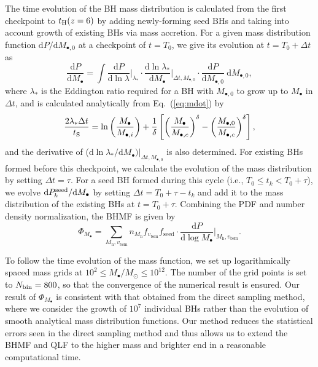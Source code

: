 \documentclass[twocolumn, twocolappendix]{aastex63}
\newcommand{\Msun}{M_\odot}
\newcommand{\Mh}{M_\mathrm{h}}
\newcommand{\Mbh}{M_\bullet}
\newcommand{\vbsm}{v_\mathrm{bsm}}
\newcommand{\tlife}{\tau}
\newcommand{\fseed}{f_\mathrm{seed}}
\newcommand{\D}{\mathrm{d}}
\begin{document}
\begin{CJK*}{UTF8}{gbsn}
The time evolution of the BH mass distribution is calculated from the first checkpoint to $t_{\rm H}(z=6)$ by adding newly-forming seed BHs
and taking into account growth of existing BHs via mass accretion.
For a given mass distribution function $\D P/\D  M_{\bullet, 0}$ at a checkpoint of $t=T_0$, 
we give its evolution at $t=T_0+\Delta t$ as
%
\begin{equation}
  \label{eq:dpdm}
  \frac{\D P}{\D \Mbh} = \int
   \frac{\D P}{\D \ln \lambda}\Big|_{\lambda_\ast} \cdot
   \frac{\D \ln \lambda_\ast}{\D  \Mbh}\Big|_{\Delta t, M_{\bullet,0}} \cdot
  \frac{\D P}{\D M_{\bullet, 0}}~\D M_{\bullet, 0},
\end{equation}
%
where $\lambda_\ast$ is the Eddington ratio required for a BH with $M_{\bullet,0}$ to grow up to $\Mbh$ in $\Delta t$,
and is calculated analytically from Eq.~(\ref{eq:mdot}) by
%
\begin{equation}
  \label{eq:mi2m}
\frac{2 \lambda_\ast \Delta t}{t_{\rm S}}=
  \ln \left(\frac{\Mbh} {M_{\bullet,i}}\right) + \frac{1}{\delta} 
  \left[ \left(\frac{\Mbh}{M_{\bullet,c}}\right)^\delta - \left(\frac{M_{\bullet, 0}}{M_{\bullet,c}}\right)^\delta \right],
\end{equation}
%
and the derivative of ($\D \ln \lambda_\ast / \D  \Mbh )|_{\Delta t, M_{\bullet,0}}$ is also determined.
For existing BHs formed before this checkpoint, we calculate the evolution of the mass distribution by setting $\Delta t = \tlife$.
For a seed BH formed during this cycle (i.e., $T_0\leq t_k < T_0+\tlife$), 
we evolve $\D P^{\rm seed}_k/\D \Mbh$ by setting $\Delta t = T_0+\tlife -t_k$ and add it to the mass distribution 
of the existing BHs at $t=T_0+\tlife$.
Combining the PDF and number density normalization, the BHMF is given by
%
\begin{equation}
  \Phi_{\Mbh} 
  =\sum_{\Mh, \vbsm} n_{\Mh} f_{\vbsm} {\fseed} \cdot \frac{\D P}{\D \log \Mbh}\Big|_{\Mh, \vbsm}.
 \end{equation}


To follow the time evolution of the mass function, we set up 
logarithmically spaced mass grids at $10^2 \leq \Mbh /\Msun \leq 10^{12}$.
The number of the grid points is set to $N_{\rm bin}=800$, so that the convergence of the numerical result is ensured.
Our result of $\Phi_{\Mbh}$ is consistent with that obtained from the direct sampling method, where 
we consider the growth of $10^7$ individual BHs rather than the evolution of smooth analytical mass distribution functions.
Our method reduces the statistical errors seen in the direct sampling method 
and thus allows us to extend the BHMF and QLF to the higher mass and brighter end
in a reasonable computational time.




\end{CJK*}
\end{document}

